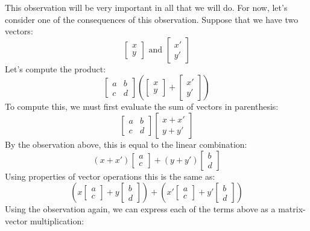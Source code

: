 \documentclass[12pt]{article}
\begin{document}
This observation will be very important in all that we will do. For now, let's consider one of the consequences of this observation. Suppose that we have two vectors:
\[
\begin{bmatrix}x\\y\end{bmatrix}\text{ and }\begin{bmatrix}x'\\y'\end{bmatrix}
\]
Let's compute the product:
\[
\begin{bmatrix}a&b\\c&d\end{bmatrix}
\left(
\begin{bmatrix}x\\y\end{bmatrix}+\begin{bmatrix}x'\\y'\end{bmatrix}
\right)
\]
To compute this, we must first evaluate the sum of vectors in parenthesis:
\[
\begin{bmatrix}a&b\\c&d\end{bmatrix}
\begin{bmatrix}x+x'\\y+y'\end{bmatrix}
\]
By the observation above, this is equal to the linear combination:
\[
(x+x')\begin{bmatrix}a\\c\end{bmatrix}+
(y+y')\begin{bmatrix}b\\d\end{bmatrix}
\]
Using properties of vector operations this is the same as:
\[
\left(x\begin{bmatrix}a\\c\end{bmatrix}+
y\begin{bmatrix}b\\d\end{bmatrix}\right) +
\left(x'\begin{bmatrix}a\\c\end{bmatrix}+
y'\begin{bmatrix}b\\d\end{bmatrix}\right)
\]
Using the observation again, we can express each of the terms above as a matrix-vector multiplication:
\end{document}
